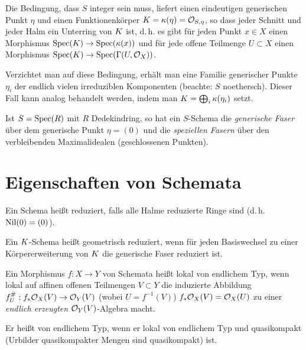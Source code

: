 \documentclass[german]{scrreprt}
\begin{document}
\begin{Definition}[Dedekindring]
  \begin{Bemerkung}
    Die Bedingung, dass $S$ integer sein muss, liefert einen eindeutigen
    generischen Punkt $\eta$ und einen Funktionenkörper
    $K=\kappa(\eta)=\mathcal{O}_{S,\eta}$, so dass jeder Schnitt und jeder Halm ein
    Unterring von $K$ ist, d.\,h. es gibt für jeden Punkt $x\in X$ einen
    Morphismus $\operatorname{Spec}(K)\to\operatorname{Spec}(\kappa(x))$ und für jede offene Teilmenge
    $U\subset X$ einen Morphismus $\operatorname{Spec}(K)\to\operatorname{Spec}(\Gamma(U,\mathcal{O}_X))$.

    Verzichtet man auf diese Bedingung, erhält man eine Familie
    generischer Punkte $\eta_i$ der endlich vielen irreduziblen
    Komponenten (beachte: $S$ noethersch). Dieser Fall kann analog
    behandelt werden, indem man $K=\bigoplus_i \kappa(\eta_i)$ setzt.
  \end{Bemerkung}

  \begin{Bemerkung}
    Ist $S=\operatorname{Spec}(R)$ mit $R$ Dedekindring, so hat ein $S$-Schema die
    \emph{generische Faser} über dem generische Punkt $\eta=(0)$ und die
    \emph{speziellen Fasern} über den verbleibenden Maximalidealen
    (geschlossenen Punkten).
  \end{Bemerkung}
\end{Definition}

\section{Eigenschaften von Schemata}
\begin{Definition}
  Ein Schema heißt reduziert, falls alle Halme reduzierte Ringe sind
  (d.\,h. $\operatorname{Nil}(0)=(0)$).

  Ein $K$-Schema heißt geometrisch reduziert, wenn für jeden
  Basiswechsel zu einer Körpererweiterung von $K$ die generische
  Faser reduziert ist. 
\end{Definition}

\begin{Definition}
  Ein Morphismus $f\colon X\to Y$ von Schemata heißt lokal von endlichem
  Typ, wenn lokal auf affinen offenen Teilmengen $V\subset Y$ die
  induzierte Abbildung $f_U^\#: f_\ast\mathcal{O}_X(V)\to \mathcal{O}_Y(V)$
  (wobei $U=f^{-1}(V)$) $f_\ast\mathcal{O}_X(V)=\mathcal{O}_X(U)$ zu einer \emph{endlich erzeugten}
  $\mathcal{O}_Y(V)$-Algebra macht.

  Er heißt von endlichem Typ, wenn er lokal von endlichem Typ und
  quasikompakt (Urbilder quasikompakter Mengen sind quasikompakt) ist.
\end{Definition}
\end{document}
